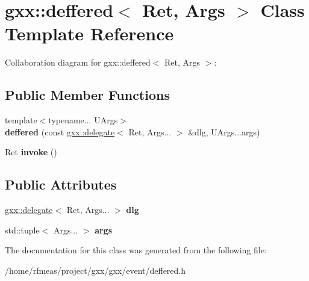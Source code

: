 \hypertarget{classgxx_1_1deffered}{}\section{gxx\+:\+:deffered$<$ Ret, Args $>$ Class Template Reference}
\label{classgxx_1_1deffered}


Collaboration diagram for gxx\+:\+:deffered$<$ Ret, Args $>$\+:
\subsection*{Public Member Functions}
\begin{DoxyCompactItemize}
\item 
{\footnotesize template$<$typename... U\+Args$>$ }\\{\bfseries deffered} (const \hyperlink{classgxx_1_1delegate}{gxx\+::delegate}$<$ Ret, Args... $>$ \&dlg, U\+Args...\+args)\hypertarget{classgxx_1_1deffered_ab813cdb2f51d78d695c1f4f807225d59}{}\label{classgxx_1_1deffered_ab813cdb2f51d78d695c1f4f807225d59}

\item 
Ret {\bfseries invoke} ()\hypertarget{classgxx_1_1deffered_a1bea81d7b89cf185a4e465589d2f7744}{}\label{classgxx_1_1deffered_a1bea81d7b89cf185a4e465589d2f7744}

\end{DoxyCompactItemize}
\subsection*{Public Attributes}
\begin{DoxyCompactItemize}
\item 
\hyperlink{classgxx_1_1delegate}{gxx\+::delegate}$<$ Ret, Args... $>$ {\bfseries dlg}\hypertarget{classgxx_1_1deffered_ae53c058c74221d95cef72d4d49732603}{}\label{classgxx_1_1deffered_ae53c058c74221d95cef72d4d49732603}

\item 
std\+::tuple$<$ Args... $>$ {\bfseries args}\hypertarget{classgxx_1_1deffered_ae9951bf8d9eb1baca9b9da699f068fc5}{}\label{classgxx_1_1deffered_ae9951bf8d9eb1baca9b9da699f068fc5}

\end{DoxyCompactItemize}


The documentation for this class was generated from the following file\+:\begin{DoxyCompactItemize}
\item 
/home/rfmeas/project/gxx/gxx/event/deffered.\+h\end{DoxyCompactItemize}
